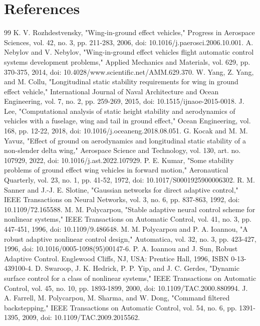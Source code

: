 \documentclass[conference]{IEEEtran}
\begin{document}
\section{References}
\begin{thebibliography}{99}
 K. V. Rozhdestvensky, "Wing-in-ground effect vehicles," Progress in Aerospace Sciences, vol. 42, no. 3, pp. 211-283, 2006, doi: 10.1016/j.paerosci.2006.10.001.
 A. Nebylov and V. Nebylov, "Wing-in-ground effect vehicles flight automatic control systems development problems," Applied Mechanics and Materials, vol. 629, pp. 370-375, 2014, doi: 10.4028/www.scientific.net/AMM.629.370.
 W. Yang, Z. Yang, and M. Collu, "Longitudinal static stability requirements for wing in ground effect vehicle," International Journal of Naval Architecture and Ocean Engineering, vol. 7, no. 2, pp. 259-269, 2015, doi: 10.1515/ijnaoe-2015-0018.
 J. Lee, "Computational analysis of static height stability and aerodynamics of vehicles with a fuselage, wing and tail in ground effect," Ocean Engineering, vol. 168, pp. 12-22, 2018, doi: 10.1016/j.oceaneng.2018.08.051.
 G. Kocak and M. M. Yavuz, "Effect of ground on aerodynamics and longitudinal static stability of a non-slender delta wing," Aerospace Science and Technology, vol. 130, art. no. 107929, 2022, doi: 10.1016/j.ast.2022.107929.
 P. E. Kumar, "Some stability problems of ground effect wing vehicles in forward motion," Aeronautical Quarterly, vol. 23, no. 1, pp. 41-52, 1972, doi: 10.1017/S0001925900006302.
 R. M. Sanner and J.-J. E. Slotine, "Gaussian networks for direct adaptive control," IEEE Transactions on Neural Networks, vol. 3, no. 6, pp. 837-863, 1992, doi: 10.1109/72.165588.
 M. M. Polycarpou, "Stable adaptive neural control scheme for nonlinear systems," IEEE Transactions on Automatic Control, vol. 41, no. 3, pp. 447-451, 1996, doi: 10.1109/9.486648.
 M. M. Polycarpou and P. A. Ioannou, "A robust adaptive nonlinear control design," Automatica, vol. 32, no. 3, pp. 423-427, 1996, doi: 10.1016/0005-1098(95)00147-6.
 P. A. Ioannou and J. Sun, Robust Adaptive Control. Englewood Cliffs, NJ, USA: Prentice Hall, 1996, ISBN 0-13-439100-4.
 D. Swaroop, J. K. Hedrick, P. P. Yip, and J. C. Gerdes, "Dynamic surface control for a class of nonlinear systems," IEEE Transactions on Automatic Control, vol. 45, no. 10, pp. 1893-1899, 2000, doi: 10.1109/TAC.2000.880994.
 J. A. Farrell, M. Polycarpou, M. Sharma, and W. Dong, "Command filtered backstepping," IEEE Transactions on Automatic Control, vol. 54, no. 6, pp. 1391-1395, 2009, doi: 10.1109/TAC.2009.2015562.

\end{thebibliography}
\end{document}
